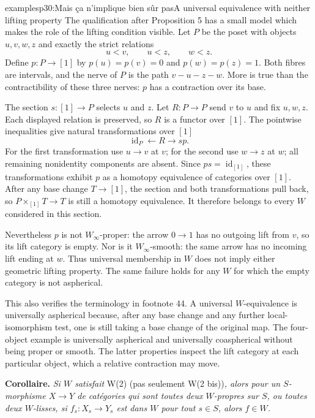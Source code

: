 \begin{dcomment}{examples}{p30:Mais ça n'implique bien sûr pas}{A universal equivalence with neither lifting property}
The qualification after Proposition 5 has a small model which makes the role of the lifting condition visible. Let $P$ be the poset with objects $u,v,w,z$ and exactly the strict relations
\[
 u<v,\qquad u<z,\qquad w<z.
\]
Define $p:P\to[1]$ by $p(u)=p(v)=0$ and $p(w)=p(z)=1$. Both fibres are intervals, and the nerve of $P$ is the path $v-u-z-w$. More is true than the contractibility of these three nerves: $p$ has a contraction over its base.

The section $s:[1]\to P$ selects $u$ and $z$. Let $R:P\to P$ send $v$ to $u$ and fix $u,w,z$. Each displayed relation is preserved, so $R$ is a functor over $[1]$. The pointwise inequalities give natural transformations over $[1]$
\[
 \operatorname{id}_P\longleftarrow R\longrightarrow sp.
\]
For the first transformation use $u\to v$ at $v$; for the second use $w\to z$ at $w$; all remaining nonidentity components are absent. Since $ps=\operatorname{id}_{[1]}$, these transformations exhibit $p$ as a homotopy equivalence of categories over $[1]$. After any base change $T\to[1]$, the section and both transformations pull back, so $P\times_{[1]}T\to T$ is still a homotopy equivalence. It therefore belongs to every $W$ considered in this section.

Nevertheless $p$ is not $W_\infty$-proper: the arrow $0\to1$ has no outgoing lift from $v$, so its lift category is empty. Nor is it $W_\infty$-smooth: the same arrow has no incoming lift ending at $w$. Thus universal membership in $W$ does not imply either geometric lifting property. The same failure holds for any $W$ for which the empty category is not aspherical.

This also verifies the terminology in footnote 44. A universal $W$-equivalence is universally aspherical because, after any base change and any further local-isomorphism test, one is still taking a base change of the original map. The four-object example is universally aspherical and universally coaspherical without being proper or smooth. The latter properties inspect the lift category at each particular object, which a relative contraction may move.
\end{dcomment}


\textbf{Corollaire.} \textit{Si $W$ satisfait} \textup{W(2) (pas seulement W(2 bis))}\textit{, alors pour un $S$-morphisme $X\longrightarrow Y$ de catégories qui sont toutes deux $W$-propres sur $S$, ou toutes deux $W$-lisses, si $f_s : X_s\longrightarrow Y_s$ est dans $W$ pour tout $s\in S$, alors $f\in W$.}

